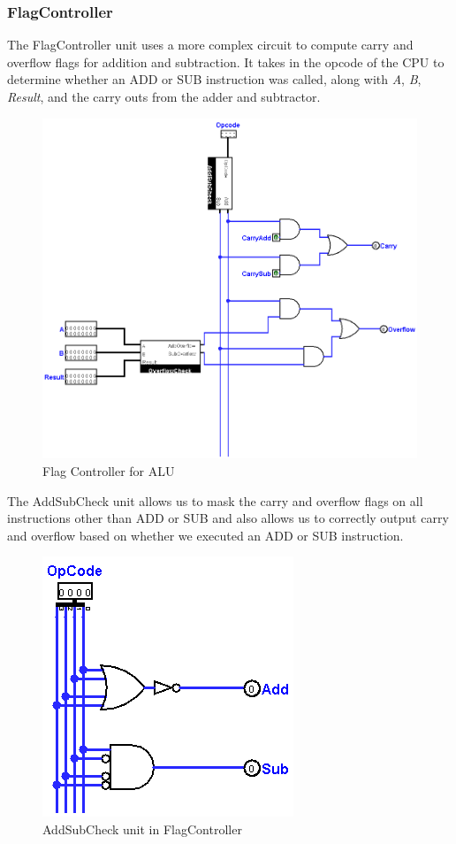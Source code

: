 \documentclass[12pt, letter]{article}
\begin{document}
	\subsubsection{FlagController}
	The FlagController unit uses a more complex circuit to compute carry and overflow flags for addition and subtraction. It takes in the opcode of the CPU to determine whether an ADD or SUB instruction was called, along with \textit{A}, \textit{B}, \textit{Result}, and the carry outs from the adder and subtractor.
	
	\begin{figure}[h]
		\centering
		\includegraphics[scale = 0.25]{FlagController}
		\caption{Flag Controller for ALU}
		\label{fig:FlagController}
	\end{figure}

	The AddSubCheck unit allows us to mask the carry and overflow flags on all instructions other than ADD or SUB and also allows us to correctly output carry and overflow based on whether we executed an ADD or SUB instruction. 
	
	\begin{figure}[h]
		\centering
		\includegraphics[scale = 0.3]{AddSubCheck}
		\caption{AddSubCheck unit in FlagController}
		\label{fig:AddSubCheck}
	\end{figure}
\end{document}
